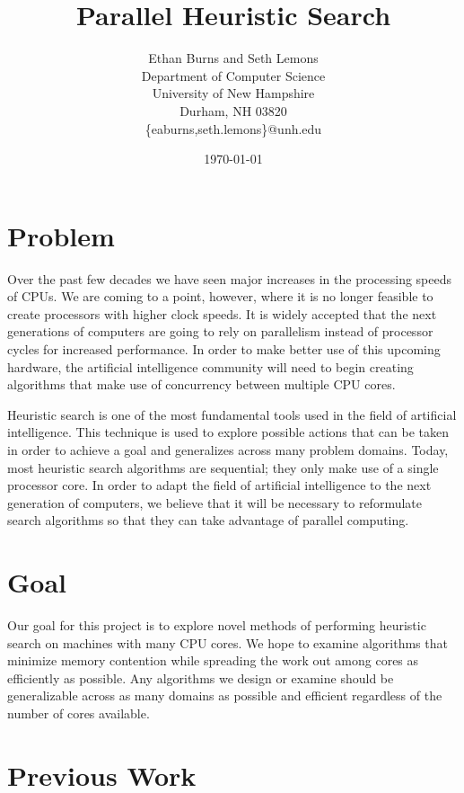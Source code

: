\documentclass{article}
\title{\textbf{Parallel Heuristic Search}}
\author{Ethan Burns and Seth Lemons \\
  Department of Computer Science \\
  University of New Hampshire \\
  Durham, NH 03820 \\
  \{eaburns,seth.lemons\}@unh.edu}
\date{\today}
\begin{document}
\maketitle

\section{Problem}

Over the past few decades we have seen major increases in the
processing speeds of CPUs.  We are coming to a point, however, where
it is no longer feasible to create processors with higher clock
speeds.  It is widely accepted that the next generations of computers
are going to rely on parallelism instead of processor cycles for
increased performance.  In order to make better use of this upcoming
hardware, the artificial intelligence community will need to begin
creating algorithms that make use of concurrency between multiple CPU
cores.

Heuristic search is one of the most fundamental tools used in the
field of artificial intelligence.  This technique is used to explore
possible actions that can be taken in order to achieve a goal and
generalizes across many problem domains.  Today, most heuristic search
algorithms are sequential; they only make use of a single processor
core.  In order to adapt the field of artificial intelligence to the
next generation of computers, we believe that it will be necessary to
reformulate search algorithms so that they can take advantage of
parallel computing.

\section{Goal}

Our goal for this project is to explore novel methods of performing
heuristic search on machines with many CPU cores. We hope to examine
algorithms that minimize memory contention while spreading the work
out among cores as efficiently as possible. Any algorithms we design
or examine should be generalizable across as many domains as possible
and efficient regardless of the number of cores available.

\section{Previous Work}
\end{document}
